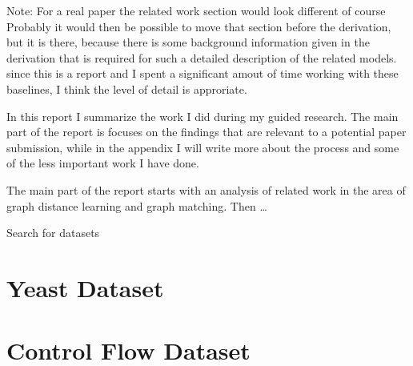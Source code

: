 \appendix
\appendixpage

Note: For a real paper the related work section would look different of course
Probably it would then be possible to move that section before the derivation, but it is there, because there is some background information given in the derivation that is required for such a detailed description of the related models.
since this is a report and I spent a significant amout of time working with these baselines, I think the level of detail is approriate.


In this report I summarize the work I did during my guided research. The main part of the report is focuses on the findings that are relevant to a potential paper submission, while in the appendix I will write more about the process and some of the less important work I have done.

The main part of the report starts with an analysis of related work in the area of graph distance learning and graph matching. Then \dots


Search for datasets

\section{Yeast Dataset}

\section{Control Flow Dataset}
